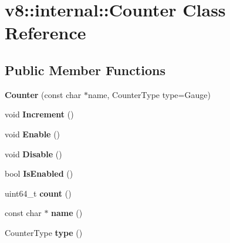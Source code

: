 \hypertarget{classv8_1_1internal_1_1_counter}{}\section{v8\+:\+:internal\+:\+:Counter Class Reference}
\label{classv8_1_1internal_1_1_counter}
\subsection*{Public Member Functions}
\begin{DoxyCompactItemize}
\item 
{\bfseries Counter} (const char $\ast$name, Counter\+Type type=Gauge)\hypertarget{classv8_1_1internal_1_1_counter_ad889277c3fcb1a1de854d38a746b3678}{}\label{classv8_1_1internal_1_1_counter_ad889277c3fcb1a1de854d38a746b3678}

\item 
void {\bfseries Increment} ()\hypertarget{classv8_1_1internal_1_1_counter_aebb2eca9123fe89e77921862546c5c08}{}\label{classv8_1_1internal_1_1_counter_aebb2eca9123fe89e77921862546c5c08}

\item 
void {\bfseries Enable} ()\hypertarget{classv8_1_1internal_1_1_counter_ac98ddafa10780025c73c0e83bcd81c7d}{}\label{classv8_1_1internal_1_1_counter_ac98ddafa10780025c73c0e83bcd81c7d}

\item 
void {\bfseries Disable} ()\hypertarget{classv8_1_1internal_1_1_counter_add559c5e10d7fde48ef45630bf38927e}{}\label{classv8_1_1internal_1_1_counter_add559c5e10d7fde48ef45630bf38927e}

\item 
bool {\bfseries Is\+Enabled} ()\hypertarget{classv8_1_1internal_1_1_counter_a7837cb1d47bfbf409da681478b152d2d}{}\label{classv8_1_1internal_1_1_counter_a7837cb1d47bfbf409da681478b152d2d}

\item 
uint64\+\_\+t {\bfseries count} ()\hypertarget{classv8_1_1internal_1_1_counter_af47eb19b2f7e287a0e3ffaef050cf512}{}\label{classv8_1_1internal_1_1_counter_af47eb19b2f7e287a0e3ffaef050cf512}

\item 
const char $\ast$ {\bfseries name} ()\hypertarget{classv8_1_1internal_1_1_counter_a45a8bf1f376f26fd81e774f9f0c4c208}{}\label{classv8_1_1internal_1_1_counter_a45a8bf1f376f26fd81e774f9f0c4c208}

\item 
Counter\+Type {\bfseries type} ()\hypertarget{classv8_1_1internal_1_1_counter_a8f6d68c837d5a4ac787ed2fe51a58166}{}\label{classv8_1_1internal_1_1_counter_a8f6d68c837d5a4ac787ed2fe51a58166}

\end{DoxyCompactItemize}
